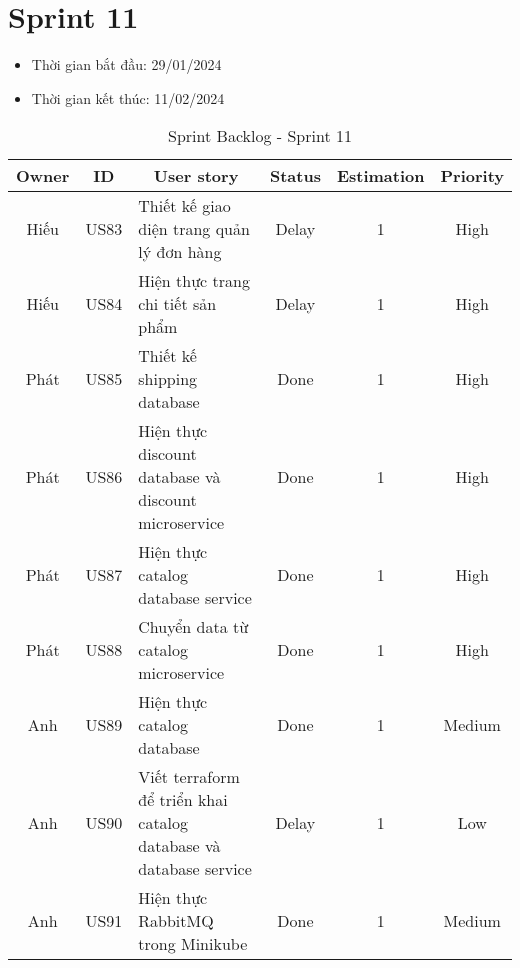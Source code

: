 \section{Sprint 11}
\begin{itemize}
    \item Thời gian bắt đầu: 29/01/2024
    \item Thời gian kết thúc: 11/02/2024
\end{itemize}
\begin{table}[H]
    \begin{tabular}{|c|c|m{6cm}|c|c|c|}
    \hline
    \textbf{Owner} & \textbf{ID} & \multicolumn{1}{c|}{\textbf{User story}}                                & \textbf{Status} & \textbf{Estimation} & \textbf{Priority} \\ \hline
    Hiếu         & US83        & Thiết kế giao diện trang quản lý đơn hàng                    & Delay            & 1                   & High         \\ \hline
    Hiếu        & US84        & Hiện thực trang chi tiết sản phẩm                     & Delay            & 1                   & High         \\ \hline
    Phát         & US85        & Thiết kế shipping database                    & Done            & 1                   & High         \\ \hline
    Phát        & US86        & Hiện thực discount database và discount microservice                  & Done            & 1                   & High         \\ \hline
    Phát        & US87        & Hiện thực catalog database service                   & Done            & 1                   & High         \\ \hline
    Phát        & US88        & Chuyển data từ catalog microservice                   & Done            & 1                   & High         \\ \hline
    Anh        & US89        & Hiện thực catalog database                   & Done            & 1                   & Medium         \\ \hline
    Anh        & US90        & Viết terraform để triển khai catalog database và database service                   & Delay            & 1                   & Low         \\ \hline
    Anh        & US91        & Hiện thực RabbitMQ trong Minikube                   & Done            & 1                   & Medium         \\ \hline
    \end{tabular}
    \caption{Sprint Backlog - Sprint 11}
    \label{tab:sprint-11}
\end{table}